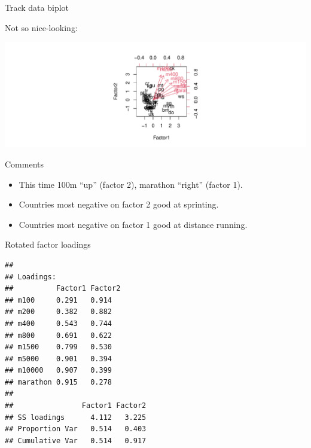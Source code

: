 \documentclass[
  ignorenonframetext,
]{beamer}
\newenvironment{Shaded}{\begin{snugshade}}{\end{snugshade}}
\newcommand{\DataTypeTok}[1]{\textcolor[rgb]{0.13,0.29,0.53}{#1}}
\newcommand{\KeywordTok}[1]{\textcolor[rgb]{0.13,0.29,0.53}{\textbf{#1}}}
\newcommand{\NormalTok}[1]{#1}
\newcommand{\OperatorTok}[1]{\textcolor[rgb]{0.81,0.36,0.00}{\textbf{#1}}}
\begin{document}
\begin{frame}[fragile]{Track data biplot}
\protect\hypertarget{track-data-biplot}{}

Not so nice-looking:

\begin{Shaded}
\end{Shaded}

\includegraphics{slides_d29_files/figure-beamer/siracusa-1.pdf}

\end{frame}

\begin{frame}{Comments}
\protect\hypertarget{comments-36}{}

\begin{itemize}
\item
  This time 100m ``up'' (factor 2), marathon ``right'' (factor 1).
\item
  Countries most negative on factor 2 good at sprinting.
\item
  Countries most negative on factor 1 good at distance running.
\end{itemize}

\end{frame}

\begin{frame}[fragile]{Rotated factor loadings}
\protect\hypertarget{rotated-factor-loadings}{}

\small

\begin{Shaded}
\end{Shaded}

\begin{verbatim}
## 
## Loadings:
##          Factor1 Factor2
## m100     0.291   0.914  
## m200     0.382   0.882  
## m400     0.543   0.744  
## m800     0.691   0.622  
## m1500    0.799   0.530  
## m5000    0.901   0.394  
## m10000   0.907   0.399  
## marathon 0.915   0.278  
## 
##                Factor1 Factor2
## SS loadings      4.112   3.225
## Proportion Var   0.514   0.403
## Cumulative Var   0.514   0.917
\end{verbatim}

\normalsize

\end{frame}
\end{document}
